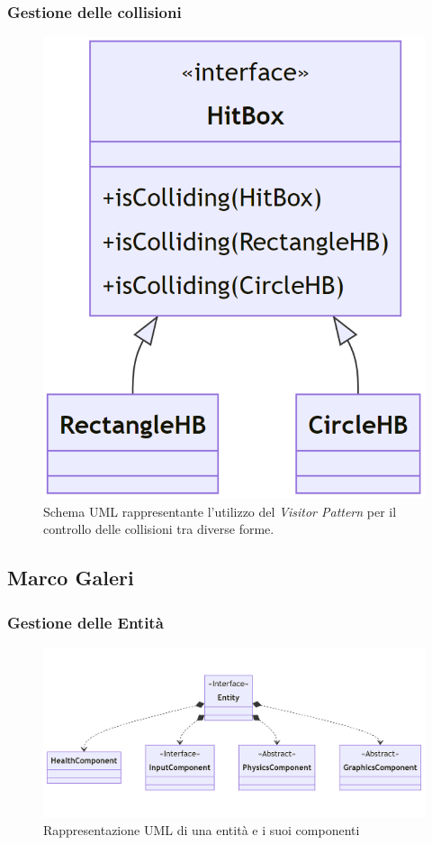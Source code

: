 \documentclass[a4paper,12pt]{report}
\begin{document}
\subsubsection{Gestione delle collisioni}
\begin{figure}[H]
\centering{}
\includegraphics[scale = 0.5]{img/HitBox.PNG}
\caption{Schema UML rappresentante l'utilizzo del \emph{Visitor Pattern} per il controllo delle collisioni tra diverse forme.}
\end{figure}
\subsection*{Marco Galeri}

\subsubsection{Gestione delle Entità}

\begin{figure}[H]
\centering
    \includegraphics[width=\textwidth,height=2\textheight,keepaspectratio]{img/EntityUML.png}
    \caption{Rappresentazione UML di una entità e i suoi componenti}
\end{figure}
\end{document}
